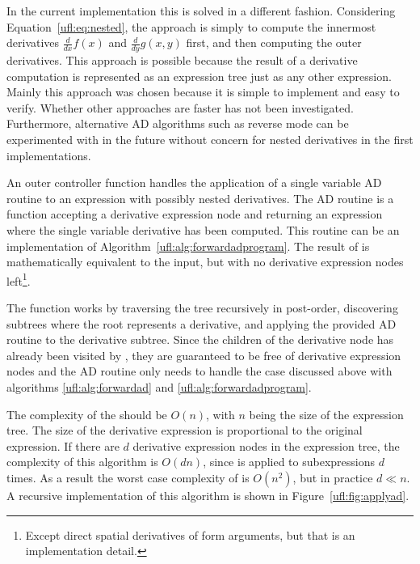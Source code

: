 In the current \ufl{} implementation this is solved in a different
fashion.  Considering Equation~\eqref{ufl:eq:nested}, the approach is
simply to compute the innermost derivatives $\frac{d}{dx} f(x)$ and
$\frac{d}{dy} g(x,y)$ first, and then computing the outer derivatives.
This approach is possible because the result of a derivative
computation is represented as an expression tree just as any other
expression.  Mainly this approach was chosen because it is simple to
implement and easy to verify.  Whether other approaches are faster has
not been investigated.  Furthermore, alternative AD algorithms such as
reverse mode can be experimented with in the future without concern
for nested derivatives in the first implementations.

An outer controller function  handles the application
of a single variable AD routine to an expression with possibly nested
derivatives.  The AD routine is a function accepting a derivative
expression node and returning an expression where the single variable
derivative has been computed.  This routine can be an implementation
of Algorithm~\ref{ufl:alg:forwardadprogram}.  The result of
 is mathematically equivalent to the input, but with
no derivative expression nodes left\footnote{Except direct spatial
  derivatives of form arguments, but that is an implementation
  detail.}.

The function  works by traversing the tree
recursively in post-order, discovering subtrees where the root
represents a derivative, and applying the provided AD routine to the
derivative subtree.  Since the children of the derivative node has
already been visited by , they are guaranteed to be
free of derivative expression nodes and the AD routine only needs to
handle the case discussed above with algorithms
\ref{ufl:alg:forwardad} and \ref{ufl:alg:forwardadprogram}.

The complexity of the  should be $O(n)$, with $n$
being the size of the expression tree.  The size of the derivative
expression is proportional to the original expression.  If there are
$d$ derivative expression nodes in the expression tree, the complexity
of this algorithm is $O(d n)$, since  is applied to
subexpressions $d$ times.  As a result the worst case complexity of
 is $O(n^2)$, but in practice $d \ll n$.  A recursive
implementation of this algorithm is shown in
Figure~\ref{ufl:fig:applyad}.

